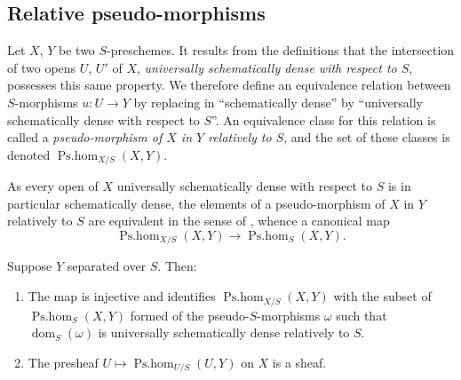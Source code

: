 \subsection{Relative pseudo-morphisms}
\label{IV.20.5}

\begin{env}[20.5.1]
\label{IV.20.5.1}
Let $X$, $Y$ be two $S$-preschemes.
It results from the definitions  that the intersection of two opens $U$, $U'$ of $X$, \emph{universally schematically dense with respect to $S$}, possesses this same property.
We therefore define an equivalence relation between $S$-morphisms $u:U\to Y$ by replacing in  ``schematically dense'' by ``universally schematically dense with respect to $S$''.
An equivalence class for this relation is called a \emph{pseudo-morphism of $X$ in $Y$ relatively to $S$}, and the set of these classes is denoted $\operatorname{Ps.hom}_{X/S}(X,Y)$.
\end{env}

\begin{env}[20.5.2]
\label{IV.20.5.2}
As every open of $X$ universally schematically dense with respect to $S$ is in particular schematically dense, the elements of a pseudo-morphism
of $X$ in $Y$ relatively to $S$ are equivalent in the sense of , whence a canonical map
\[
\label{IV.20.5.2.1}
  \operatorname{Ps.hom}_{X/S}(X,Y)\to\operatorname{Ps.hom}_S(X,Y).
  \tag{20.5.2.1}
\]
\end{env}

\begin{proposition}[20.5.3]
\label{IV.20.5.3}
Suppose $Y$ separated over $S$.
Then:
\begin{enumerate}[label=\emph{(\roman*)}]
  \item The map  is injective and identifies $\operatorname{Ps.hom}_{X/S}(X,Y)$ with the subset of $\operatorname{Ps.hom}_S(X,Y)$ formed of the pseudo-$S$-morphisms $\omega$ such that $\operatorname{dom}_S(\omega)$ is universally schematically dense relatively to $S$.
  \item The presheaf $U\mapsto\operatorname{Ps.hom}_{U/S}(U,Y)$ on $X$ is a sheaf.
\end{enumerate}
\end{proposition}

